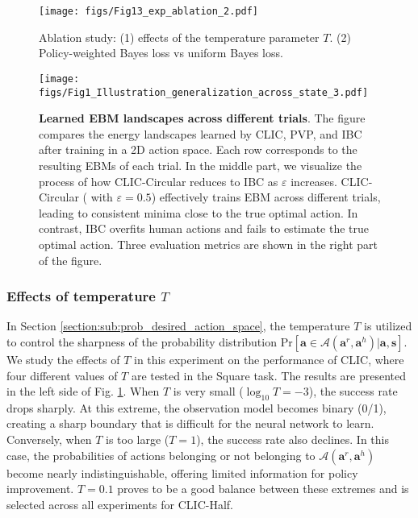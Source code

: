 \begin{figure}[t]
    \centering
    \texttt{[image: figs/Fig13\_exp\_ablation\_2.pdf]}
	\caption{Ablation study: (1) effects of the temperature parameter $T$. (2) Policy-weighted Bayes loss vs uniform Bayes loss.}
 \label{fig:Fig13_exp_ablation_2}
\end{figure}

\begin{figure*}[t]
	\centering
    \texttt{[image: figs/Fig1\_Illustration\_generalization\_across\_state\_3.pdf]}
	\caption{ \textbf{Learned EBM landscapes across different trials}. The figure compares the energy landscapes learned by CLIC, PVP, and IBC after training in a 2D action space. Each row corresponds to the resulting EBMs of each trial. 
    In the middle part, we visualize the process of how CLIC-Circular reduces to IBC as $\varepsilon$ increases.
    CLIC-Circular ( with $\varepsilon=0.5$) effectively trains EBM across different trials, leading to consistent minima close to the true optimal action. In contrast, IBC overfits human actions and fails to estimate the true optimal action. Three evaluation metrics are shown in the right part of the figure.}
 \label{Fig1_Illustration_generalization_across_state}
\end{figure*}


\subsubsection{Effects of temperature $T$}
In Section \ref{section:sub:prob_desired_action_space}, the temperature $T$ is utilized to control the sharpness of the probability distribution $\text{Pr} [\bm a \in \mathcal{A} {(\bm a^r, \bm a^h)} | \bm a , \bm s] $.
We study the effects of $T$ in this experiment on the performance of CLIC, where four different values of $T$ are tested in the Square task. 
The results are presented in the left side of Fig. \ref{fig:Fig13_exp_ablation_2}.
When $T$ is very small ($\log_{10} T = -3$), the success rate drops sharply. At this extreme, the observation model becomes binary (0/1), creating a sharp boundary that is difficult for the neural network to learn. Conversely, when $T$ is too large ($T = 1$), the success rate also declines. In this case, the probabilities of actions belonging or not belonging to $\mathcal{A} {(\bm a^r, \bm a^h)}$ become nearly indistinguishable, offering limited information for policy improvement.
$T = 0.1$ proves to be a good balance between these extremes and is selected across all experiments for CLIC-Half. 


